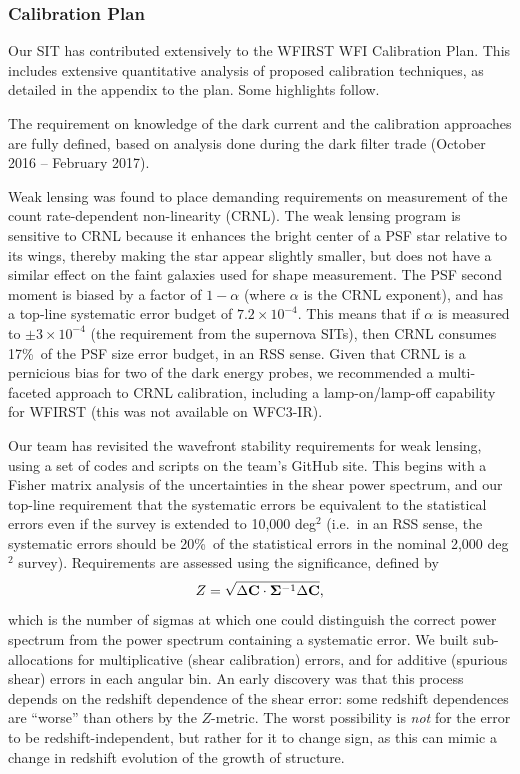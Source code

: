 \subsubsection{Calibration Plan}
\label{sec:calibration_plan}
Our SIT has contributed extensively to the WFIRST WFI Calibration Plan. This includes extensive quantitative analysis of proposed calibration techniques, as detailed in the appendix to the plan. Some highlights follow.

The requirement on knowledge of the dark current and the calibration approaches are fully defined, based on analysis done during the dark filter trade (October 2016 -- February 2017).

Weak lensing was found to place demanding requirements on measurement of the count rate-dependent non-linearity (CRNL). The weak lensing program is sensitive to CRNL because it enhances the bright center of a PSF star relative to its wings, thereby making the star appear slightly smaller, but does not have a similar effect on the faint galaxies used for shape measurement. The PSF second moment is biased by a factor of $1-\alpha$ (where $\alpha$ is the CRNL exponent), and has a top-line systematic error budget of $7.2\times 10^{-4}$. This means that if $\alpha$ is measured to $\pm 3\times 10^{-4}$ (the requirement from the supernova SITs), then CRNL consumes 17\%\ of the PSF size error budget, in an RSS sense. Given that CRNL is a pernicious bias for two of the dark energy probes, we recommended a multi-faceted approach to CRNL calibration, including a lamp-on/lamp-off capability for WFIRST (this was not available on WFC3-IR).

Our team has revisited the wavefront stability requirements for weak lensing, using a set of codes and scripts on the team's GitHub site. This begins with a Fisher matrix analysis of the uncertainties in the shear power spectrum, and our top-line requirement that the systematic errors be equivalent to the statistical errors even if the survey is extended to 10,000 deg$^2$ (i.e.\ in an RSS sense, the systematic errors should be 20\%\ of the statistical errors in the nominal 2,000 deg$^2$ survey). Requirements are assessed using the significance, defined by
\begin{equation}
Z = \sqrt{\Delta{\bf C}\cdot{\bf\Sigma}^{-1}\Delta{\bf C}},
\label{eq:alpha}
\end{equation}
which is the number of sigmas at which one could distinguish the correct power spectrum from the power spectrum containing a systematic error. We built sub-allocations for multiplicative (shear calibration) errors, and for additive (spurious shear) errors in each angular bin. An early discovery was that this process depends on the redshift dependence of the shear error: some redshift dependences are ``worse'' than others by the $Z$-metric. The worst possibility is {\em not} for the error to be redshift-independent, but rather for it to change sign, as this can mimic a change in redshift evolution of the growth of structure.

